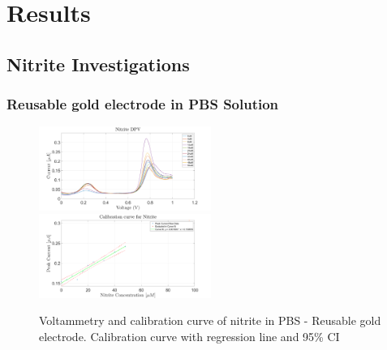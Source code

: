 \section{Results}

\subsection{Nitrite Investigations}

\subsubsection{Reusable gold electrode in PBS Solution}
\begin{figure}[H]
    \centering
    \includegraphics[width = 0.5\textwidth]{img/nitrite clean reus.png}
    \includegraphics[width = 0.5\textwidth]{img/nitrite clean reus calibration.PNG}
     \caption{Voltammetry and calibration curve of nitrite in PBS - Reusable gold electrode. Calibration curve with regression line and 95\% CI} 
    \label{fig:nitrite_result_1}
\end{figure}

